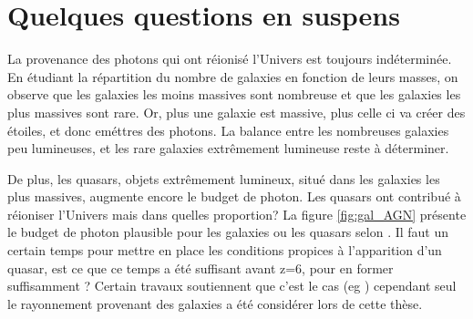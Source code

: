 %
%



\section{Quelques questions en suspens}



La provenance des photons qui ont réionisé l'Univers est toujours indéterminée.
En étudiant la répartition du nombre de galaxies en fonction de leurs masses, on observe que les galaxies les moins massives sont nombreuse et que les galaxies les plus massives sont rare.
Or, plus une galaxie est massive, plus celle ci va créer des étoiles, et donc eméttres des photons.
La balance entre les nombreuses galaxies peu lumineuses, et les rare galaxies extrêmement lumineuse reste à déterminer.

De plus, les quasars, objets extrêmement lumineux, situé dans les galaxies les plus massives, augmente encore le budget de photon.
Les quasars ont contribué à réioniser l'Univers mais dans quelles proportion?
La figure \ref{fig:gal_AGN} présente le budget de photon plausible pour les galaxies ou les quasars selon \cite{trac_computer_2011}.
Il faut un certain temps pour mettre en place les conditions propices à l'apparition d'un quasar, est ce que ce temps a été suffisant avant z=6, pour en former suffisamment ?
Certain travaux soutiennent que c'est le cas (eg \cite{chardin_large-scale_2017}) cependant seul le rayonnement provenant des galaxies a été considérer lors de cette thèse.

